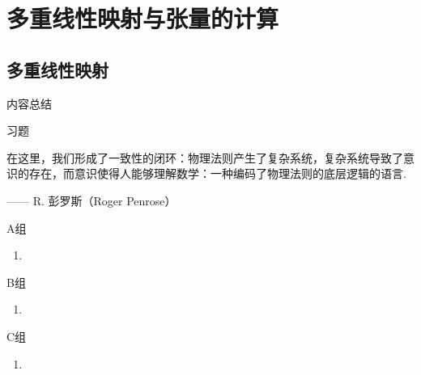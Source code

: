 \chapter{多重线性映射与张量的计算}

\section{多重线性映射}

\vspace{2ex}
\centerline{\heiti \Large 内容总结}

\vspace{2ex}
\centerline{\heiti \Large 习题}

\vspace{2ex}
{\kaishu 在这里，我们形成了一致性的闭环：物理法则产生了复杂系统，复杂系统导致了意识的存在，而意识使得人能够理解数学：一种编码了物理法则的底层逻辑的语言.}
\begin{flushright}
    \kaishu
    —— R. 彭罗斯（Roger Penrose）
\end{flushright}

\centerline{\heiti A组}
\begin{enumerate}
    \item
\end{enumerate}

\centerline{\heiti B组}
\begin{enumerate}
    \item
\end{enumerate}

\centerline{\heiti C组}
\begin{enumerate}
    \item
\end{enumerate}

